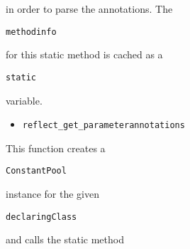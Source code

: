 \documentclass[a4paper, 10pt, titlepage]{scrartcl} %
\begin{document}
in order to parse the annotations. The \begin{scriptsize}\verb|methodinfo|\end{scriptsize} for this static method is
cached as a \begin{scriptsize}\verb|static|\end{scriptsize} variable.

\begin{itemize}
 \item \begin{scriptsize}\verb|reflect_get_parameterannotations|\end{scriptsize}
\end{itemize}
This function creates a \begin{scriptsize}\verb|ConstantPool|\end{scriptsize} instance for the given
\begin{scriptsize}\verb|declaringClass|\end{scriptsize} and calls the static method
\end{document}
